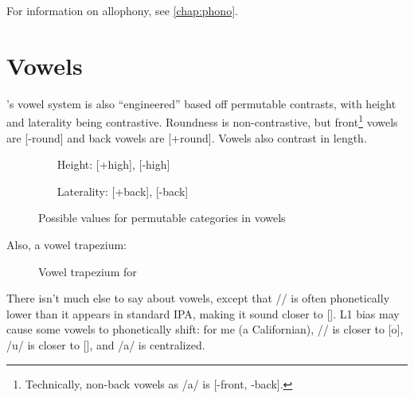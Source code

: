 For information on allophony, see \autoref{chap:phono}.

\section{Vowels}
\kurango's vowel system is also ``engineered'' based off permutable contrasts, with height and laterality being contrastive. Roundness is non-contrastive, but front\footnote{Technically, non-back vowels as /a/ is [-front, -back].} vowels are [-round] and back vowels are [+round]. Vowels also contrast in length.

	\begin{figure}[H]
	\label{permute_vow}
	\begin{enumerate}
	\centering
		\item[Height:] [+high], [-high]
		\item[Laterality:] [+back], [-back]
	\end{enumerate}

	\begin{center}
		\caption{Possible values for permutable categories in {\kurango} vowels}
	\end{center}
	\end{figure}

Also, a vowel trapezium:

	\begin{figure}[H]
	\label{trapezium}
	\begin{center}
		\begin{vowel}[three]
		\end{vowel}
	\caption{Vowel trapezium for \kurango}
	\end{center}
	\end{figure}

There isn't much else to say about vowels, except that /\OO/ is often phonetically lower than it appears in standard IPA, making it sound closer to []. L1 bias may cause some {\kurango} vowels to phonetically shift: for me (a Californian), /\OO/ is closer to [o], /u/ is closer to [], and /a/ is centralized.